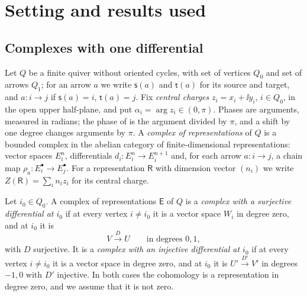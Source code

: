 \section{Setting and results used}\label{sec:setting}

\subsection{Complexes with one differential}
Let $Q$ be a finite quiver without oriented cycles, with set of vertices
$Q_0$ and set of arrows $Q_1$; for an arrow $a$ we write $\mathsf s(a)$ and
$\mathsf t(a)$ for its source and target, and $a:i\to j$ if
$\mathsf s(a)=i$, $\mathsf t(a)=j$. Fix \emph{central charges}
$z_i=x_i+\ii y_i$, $i\in Q_0$, in the open upper half-plane, and put
$\alpha_i=\arg z_i\in(0,\pi)$. Phases are arguments, measured in radians; the
phase of \cite{bri07} is the argument divided by $\pi$, and a shift by one
degree changes arguments by $\pi$. A \emph{complex of representations} of $Q$
is a bounded complex in the abelian category of finite-dimensional
representations: vector spaces $E_i^n$, differentials
$d_i:E_i^n\to E_i^{n+1}$ and, for each arrow $a:i\to j$, a chain map
$\rho_a:E_i^\bullet\to E_j^\bullet$. For a representation $\mathsf R$ with
dimension vector $(n_i)$ we write $Z(\mathsf R)=\sum_in_iz_i$ for its central
charge.

\begin{definition}\label{def:type}
Let $i_0\in Q_0$. A complex of representations $\mathsf E$ of $Q$ is a
\emph{complex with a surjective differential at $i_0$} if at every vertex
$i\neq i_0$ it is a vector space $W_i$ in degree zero, and at $i_0$ it is
\[
 V\xrightarrow{\ D\ }U\qquad\text{in degrees }0,1,
\]
with $D$ surjective. It is a \emph{complex with an injective differential at
$i_0$} if at every vertex $i\neq i_0$ it is a vector space in degree zero,
and at $i_0$ it is $U'\xrightarrow{D'}V'$ in degrees $-1,0$ with $D'$
injective. In both cases the cohomology is a representation in degree zero,
and we assume that it is not zero.
\end{definition}

